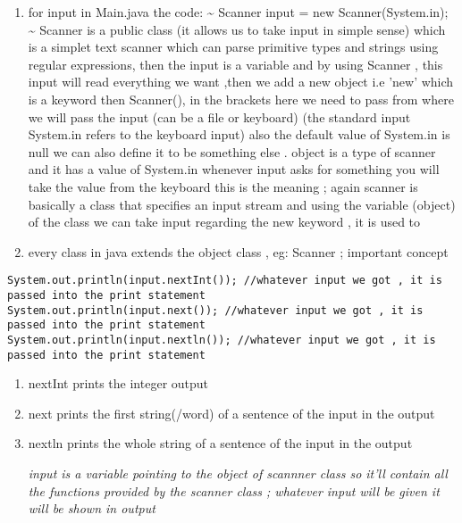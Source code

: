 \documentclass[11pt]{article}
\begin{document}
\begin{enumerate}
\item for input in Main.java the code: \textasciitilde{} Scanner input = new Scanner(System.in); \textasciitilde{}  Scanner is a public class (it allows us to take input in simple sense) which is a simplet text scanner which can parse primitive types and strings using regular expressions, then the input is a variable and by using Scanner , this input will read everything we want ,then we add a new object i.e 'new' which is a keyword then Scanner(), in the brackets here we need to pass from where we will pass the input (can be a file or keyboard) (the standard input System.in refers to the keyboard input) also the default value of System.in is null we can also define it to be something else . object is a type of scanner and it has a value of System.in whenever input asks for something you will take the value from the keyboard this is the meaning ; again scanner is basically a class that specifies an input stream and using the variable (object) of the class we can take input
regarding the new keyword , it is used to

\item every class in java extends the object class , eg: Scanner ; important concept
\end{enumerate}

\begin{verbatim}
System.out.println(input.nextInt()); //whatever input we got , it is passed into the print statement
System.out.println(input.next()); //whatever input we got , it is passed into the print statement
System.out.println(input.nextln()); //whatever input we got , it is passed into the print statement
\end{verbatim}

\begin{enumerate}
\item nextInt prints the integer output
\item next prints the first string(/word) of a sentence of the input in the output
\item nextln prints the whole string of a sentence of the input in the output

\emph{input is a variable pointing to the object of scannner class so it'll contain all the functions provided by the scanner class ; whatever input will be given it will be shown in output}
\end{enumerate}
\end{document}
